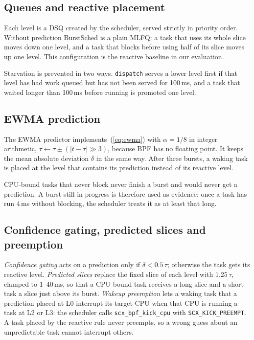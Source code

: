 \documentclass[conference]{IEEEtran}
\newcommand{\ms}{\,ms}
\newcommand{\code}[1]{\texttt{\small #1}}
\begin{document}
\subsection{Queues and reactive placement}

Each level is a DSQ created by the scheduler, served strictly in priority order. Without
prediction BurstSched is a plain MLFQ: a task that uses its whole slice moves down one level,
and a task that blocks before using half of its slice moves up one level. This configuration
is the reactive baseline in our evaluation.

Starvation is prevented in two ways. \code{dispatch} serves a lower level first if that level
has had work queued but has not been served for 100\ms, and a task that waited longer than
100\ms{} before running is promoted one level.

\subsection{EWMA prediction}

The EWMA predictor implements~(\ref{eq:ewma}) with $\alpha = 1/8$ in integer arithmetic,
$\tau \leftarrow \tau \pm (|t - \tau| \gg 3)$, because BPF has no floating point. It keeps the mean
absolute deviation $\delta$ in the same way. After three bursts, a waking task is placed at the
level that contains its prediction instead of its reactive level.

CPU-bound tasks that never block never finish a burst and would never get a prediction. A
burst still in progress is therefore used as evidence: once a task has run 4\ms{} without
blocking, the scheduler treats it as at least that long.

\subsection{Confidence gating, predicted slices and preemption}

\emph{Confidence gating} acts on a prediction only if $\delta < 0.5\,\tau$; otherwise the task
gets its reactive level. \emph{Predicted slices} replace the fixed slice of each level with
$1.25\,\tau$, clamped to 1--40\ms, so that a CPU-bound task receives a long slice and a short task
a slice just above its burst. \emph{Wakeup preemption} lets a waking task that a prediction
placed at L0 interrupt its target CPU when that CPU is running a task at L2 or L3: the scheduler
calls \code{scx\_bpf\_kick\_cpu} with \code{SCX\_KICK\_PREEMPT}. A task placed by the reactive
rule never preempts, so a wrong guess about an unpredictable task cannot interrupt others.
\end{document}
